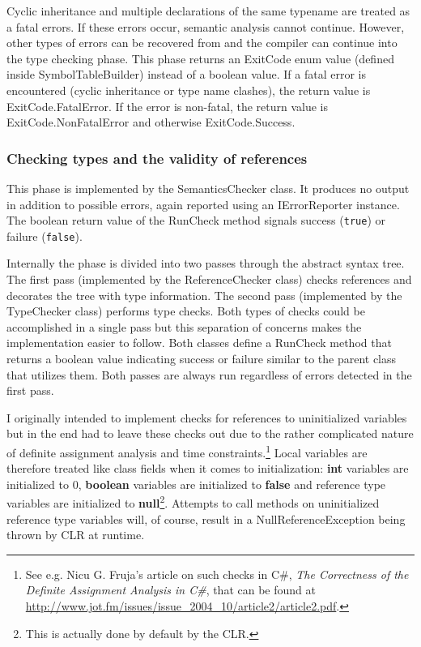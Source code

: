 \documentclass[a4paper,11pt]{article}
\begin{document}
Cyclic inheritance and multiple declarations of the same typename are treated as a fatal errors. If these errors occur, semantic analysis cannot continue. However, other types of errors can be recovered from and the compiler can continue into the type checking phase. This phase returns an ExitCode enum value (defined inside SymbolTableBuilder) instead of a boolean value. If a fatal error is encountered (cyclic inheritance or type name clashes), the return value is ExitCode.FatalError. If the error is non-fatal, the return value is ExitCode.NonFatalError and otherwise ExitCode.Success.

\subsubsection{Checking types and the validity of references}

This phase is implemented by the SemanticsChecker class. It produces no output in addition to possible errors, again reported using an IErrorReporter instance. The boolean return value of the RunCheck method signals success (\verb,true,) or failure (\verb,false,).

Internally the phase is divided into two passes through the abstract syntax tree. The first pass (implemented by the ReferenceChecker class) checks references and decorates the tree with type information. The second pass (implemented by the TypeChecker class) performs type checks. Both types of checks could be accomplished in a single pass but this separation of concerns makes the implementation easier to follow. Both classes define a RunCheck method that returns a boolean value indicating success or failure similar to the parent class that utilizes them. Both passes are always run regardless of errors detected in the first pass.

I originally intended to implement checks for references to uninitialized variables but in the end had to leave these checks out due to the rather complicated nature of definite assignment analysis and time constraints.\footnote{See e.g. Nicu G. Fruja's article on such checks in C\#, \emph{The Correctness of the Definite Assignment Analysis in C\#}, that can be found at \url{http://www.jot.fm/issues/issue_2004_10/article2/article2.pdf}.} Local variables are therefore treated like class fields when it comes to initialization: \textbf{int} variables are initialized to 0, \textbf{boolean} variables are initialized to \textbf{false} and reference type variables are initialized to \textbf{null}\footnote{This is actually done by default by the CLR.}. Attempts to call methods on uninitialized reference type variables will, of course, result in a NullReferenceException being thrown by CLR at runtime.
\end{document}
